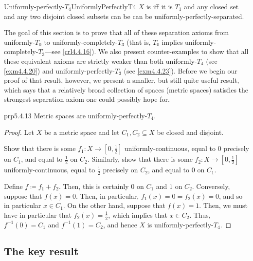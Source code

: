 \begin{dfn}{Uniformly-perfectly-$T_4$\hfill}{UniformlyPerfectlyT4}
$X$ is  iff it is $T_1$ and any closed set and any two disjoint closed subsets can be can be uniformly-perfectly-separated.
\end{dfn}
The goal of this section is to prove that all of these separation axioms from uniformly-$T_0$ to uniformly-completely-$T_3$ (that is, $T_0$ implies uniformly-completely-$T_3$---see \cref{crl4.4.16}).  We also present counter-examples to show that all these equivalent axioms are strictly weaker than both uniformly-$T_4$ (see \cref{exm4.4.20}) and uniformly-perfectly-$T_3$ (see \cref{exm4.4.23}).  Before we begin our proof of that result, however, we present a smaller, but still quite useful result, which says that a relatively broad collection of spaces (metric spaces) satisfies the strongest separation axiom one could possibly hope for.
\begin{prp}{}{prp5.4.13}
Metric spaces are uniform\-ly-perfectly-$T_4$.
\begin{proof}
Let $X$ be a metric space and let $C_1,C_2\subseteq X$ be closed and disjoint.
\begin{exr}[breakable=false]{}{}
Show that there is some $f_1:X\rightarrow [0,\frac{1}{2}]$ uniformly-continuous, equal to $0$ precisely on $C_1$, and equal to $\frac{1}{2}$ on $C_2$.  Similarly, show that there is some $f_2:X\rightarrow [0,\frac{1}{2}]$ uniformly-continuous, equal to $\frac{1}{2}$ precisely on $C_2$, and equal to $0$ on $C_1$.
\end{exr}
Define $f\coloneqq f_1+f_2$.  Then, this is certainly $0$ on $C_1$ and $1$ on $C_2$.  Conversely, suppose that $f(x)=0$.  Then, in particular, $f_1(x)=0=f_2(x)=0$, and so in particular $x\in C_1$.  On the other hand, suppose that $f(x)=1$.  Then, we must have in particular that $f_2(x)=\frac{1}{2}$, which implies that $x\in C_2$.  Thus, $f^{-1}(0)=C_1$ and $f^{-1}(1)=C_2$, and hence $X$ is uniformly-perfectly-$T_4$.
\end{proof}
\end{prp}

\subsection{The key result}

